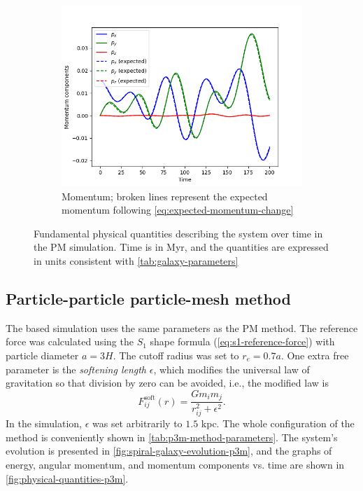 \begin{figure}[!ht]
    \vspace{0.2cm}

    \begin{subfigure}[b]{0.45\textwidth}
        \centering
        \includegraphics[width=\textwidth]{chapters/results/img/pm-galaxy/momentum.png}
        \caption{Momentum; broken lines represent the expected momentum following \autoref{eq:expected-momentum-change}}
        \label{fig:physical-quantities-pm-sub3}
    \end{subfigure}

    \caption{Fundamental physical quantities describing the system over time in the PM simulation.
        Time is in Myr, and the quantities are expressed in units consistent with \autoref{tab:galaxy-parameters}}
    \label{fig:physical-quantities-pm}
\end{figure}

\subsection{Particle-particle particle-mesh method}
The \PThreeM{} based simulation uses the same parameters as the PM method.
The reference force was calculated using the $S_1$ shape formula (\autoref{eq:s1-reference-force}) with particle diameter $a=3H$.
The cutoff radius was set to $r_e=0.7a$.
One extra free parameter is the \textit{softening length} $\epsilon$, which modifies the universal law of gravitation so that division by zero can be avoided, i.e., the modified law is
\begin{equation*}
    F^\text{soft}_{ij}(r) = \frac{G m_i m_j}{r_{ij}^2 + \epsilon^2}.
\end{equation*}
In the simulation, $\epsilon$ was set arbitrarily to $1.5$ kpc.
The whole configuration of the \PThreeM{} method is conveniently shown in \autoref{tab:p3m-method-parameters}.
The system's evolution is presented in \autoref{fig:spiral-galaxy-evolution-p3m}, and the graphs of energy, angular momentum, and momentum components vs. time are shown in \autoref{fig:physical-quantities-p3m}.

